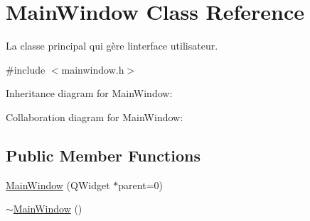 \hypertarget{class_main_window}{}\section{Main\+Window Class Reference}
\label{class_main_window}


La classe principal qui gère l\textquotesingle{}interface utilisateur.  




{\ttfamily \#include $<$mainwindow.\+h$>$}



Inheritance diagram for Main\+Window\+:


Collaboration diagram for Main\+Window\+:
\subsection*{Public Member Functions}
\begin{DoxyCompactItemize}
\item 
\mbox{\hyperlink{class_main_window_a8b244be8b7b7db1b08de2a2acb9409db}{Main\+Window}} (Q\+Widget $\ast$parent=0)
\item 
\mbox{\hyperlink{class_main_window_ae98d00a93bc118200eeef9f9bba1dba7}{$\sim$\+Main\+Window}} ()
\end{DoxyCompactItemize}
